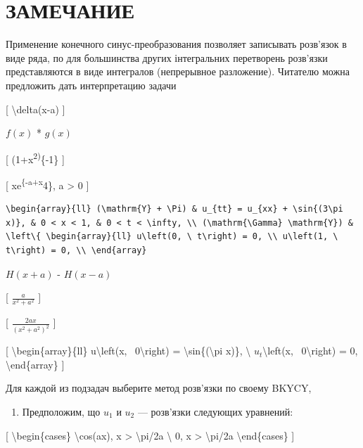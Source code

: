 \documentclass[
]{article}
\providecommand{\tightlist}{%
  \setlength{\itemsep}{0pt}\setlength{\parskip}{0pt}}
\begin{document}
{{\section{ЗАМЕЧАНИЕ}\label{ux437ux430ux43cux435ux447ux430ux43dux438ux435-1}

Применение конечного синус-преобразования позволяет записывать розв'язок
в виде ряда, по для большинства других інтегральних перетворень
розв'язки представляются в виде интегралов (непрерывное разложение).
Читателю можна предложить дать интерпретацию задачи

{[} \textbackslash delta(x-a) {]}

\(f(x)\) * \(g(x)\)

{[} (1+x\textsuperscript{2)}\{-1\} {]}

{[} xe\textsuperscript{\{-a+x}4\}, a \textgreater{} 0 {]}

\begin{verbatim}
\begin{array}{ll} (\mathrm{Y} + \Pi) & u_{tt} = u_{xx} + \sin{(3\pi x)}, & 0 < x < 1, & 0 < t < \infty, \\ (\mathrm{\Gamma} \mathrm{Y}) & \left\{ \begin{array}{ll} u\left(0, \ t\right) = 0, \\ u\left(1, \ t\right) = 0, \\ \end{array}
\end{verbatim}

\(H(x+a)\) - \(H(x-a)\)

{[} \(\frac{a}{x^2+a^2}\) {]}

{[} \(\frac{2ax}{(x^2+a^2)^2}\) {]}

{[} \textbackslash begin\{array\}\{ll\} u\textbackslash left(x,
~0\textbackslash right) = \textbackslash sin\{(\textbackslash pi x)\},
\textbackslash{} \(u_{t}\)\textbackslash left(x, ~0\textbackslash right)
= 0, \textbackslash end\{array\} {]}

Для каждой из подзадач выберите метод розв'язки по своему BKYCY,

\begin{enumerate}
\def\labelenumi{\arabic{enumi}.}
\setcounter{enumi}{2}
\tightlist
\item
  Предположим, що \(u_1\) и \(u_2\) --- розв'язки следующих уравнений:
\end{enumerate}

{[} \textbackslash begin\{cases\} \textbackslash cos(ax),
\textbar x\textbar{} \textgreater{} \textbackslash pi/2a
\textbackslash{} 0, \textbar x\textbar{} \textgreater{}
\textbackslash pi/2a \textbackslash end\{cases\} {]}

}}
\end{document}

